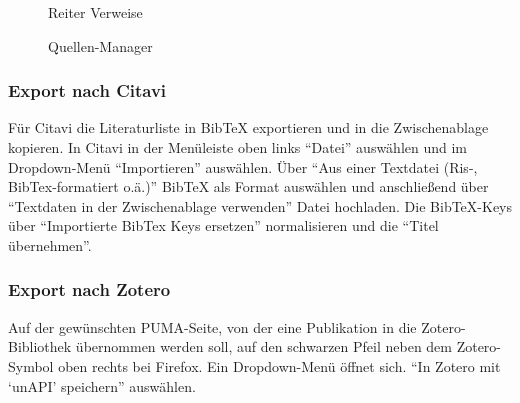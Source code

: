 \begin{figure}[h!]
 \centering
 \caption{Reiter Verweise}
 \label{fig:reiterVerweise}
\end{figure}
\begin{figure}[h!]
 \centering
 \caption{Quellen-Manager}
 \label{fig:quellenManager}
\end{figure} 

\subsubsection*{Export nach Citavi}\label{sss:exportCitavi}
Für Citavi die Literaturliste in BibTeX exportieren und in die Zwischenablage kopieren. 
In Citavi in der Menüleiste oben links \enquote{Datei} auswählen und im Dropdown-Menü \enquote{Importieren} auswählen. 
Über \enquote{Aus einer Textdatei (Ris-, BibTex-formatiert o.ä.)} BibTeX als Format auswählen und anschließend über \enquote{Textdaten in der Zwischenablage verwenden} Datei hochladen. Die BibTeX-Keys über \enquote{Importierte BibTex Keys ersetzen} normalisieren und die \enquote{Titel übernehmen}.

\subsubsection*{Export nach Zotero}\label{sss:exportZotero}
Auf der gewünschten PUMA-Seite, von der eine Publikation in die Zotero-Bibliothek übernommen werden soll, auf den schwarzen Pfeil neben dem Zotero-Symbol oben rechts bei Firefox.
Ein Dropdown-Menü öffnet sich. \enquote{In Zotero mit \enquote{unAPI} speichern} auswählen.
    

